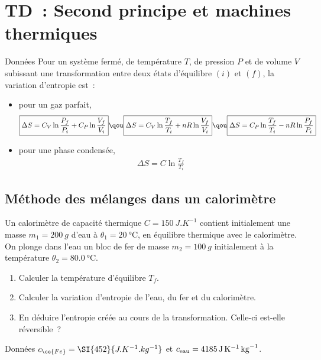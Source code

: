 \documentclass[a4paper, 10pt, final, garamond]{book}
\begin{document}
\setcounter{chapter}{2}

\chapter{TD~: Second principe et machines thermiques}

\begin{tdefi}{Données}
  Pour un système fermé, de température $T$, de pression $P$ et de volume $V$
  subissant une transformation entre deux états d'équilibre $(i)$ et $(f)$, la
  variation d'entropie est~:
  \begin{itemize}
    \item pour un gaz parfait,
      \begin{gather*}
        \boxed{\Delta S = C_V \ln \frac{P_f}{P_i} + C_P \ln \frac{V_f}{V_i}}
        \qou
        \boxed{\Delta S = C_V \ln \frac{T_f}{T_i} + nR \ln \frac{V_f}{V_i}}
        \qou
        \boxed{\Delta S = C_P \ln \frac{T_f}{T_i} - nR \ln \frac{P_f}{P_i}}
      \end{gather*}
    \item pour une phase condensée,
      \begin{gather*}
        \boxed{\Delta S = C \ln \frac{T_f}{T_i}}
      \end{gather*}
  \end{itemize}
\end{tdefi}

\section{Méthode des mélanges dans un calorimètre}
Un calorimètre de capacité thermique $C = \SI{150}{J.K^{-1}}$ contient
initialement une masse $m_1 = \SI{200}{g}$ d'eau à $\theta_1 =
\SI{20}{\degreeCelsius}$, en équilibre thermique avec le calorimètre. On plonge dans 
l'eau un bloc de fer de masse $m_2 = \SI{100}{g}$ initialement à la température
$\theta_2 = \SI{80.0}{\degreeCelsius}$.
\begin{enumerate}
  \item Calculer la température d'équilibre $T_f$.
  \item Calculer la variation d'entropie de l'eau, du fer et du calorimètre.
  \item En déduire l'entropie créée au cours de la transformation. Celle-ci
    est-elle réversible~?
\end{enumerate}
\begin{rdefi}{Données}
  $c_{\ce{Fe}} = \SI{452}{J.K^{-1}.kg^{-1}}$ et $c_{\rm eau} =
  \SI{4185}{J.K^{-1}.kg^{-1}}$.
\end{rdefi}
\end{document}
